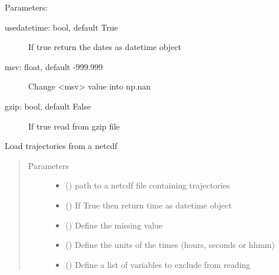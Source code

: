 \documentclass[a4paper,10pt,english]{sphinxmanual}
\begin{document}
\begin{fulllineitems}
\begin{fulllineitems}
Parameters:
\begin{description}
\item[{usedatetime: bool, default True}] \leavevmode
If true return the dates as datetime object

\item[{msv: float, default -999.999}] \leavevmode
Change \textless{}msv\textgreater{} value into np.nan

\item[{gzip: bool, default False}] \leavevmode
If true read from gzip file

\end{description}

\end{fulllineitems}


\begin{fulllineitems}
\label{\detokenize{lagranto:lagranto.Tra.load_netcdf}}
Load trajectories from a netcdf
\begin{quote}\begin{description}
\item[{Parameters}] \leavevmode\begin{itemize}
\item {} 
 (\sphinxstyleliteralemphasis{,}) \textendash{} path to a netcdf file containing trajectories

\item {} 
 (\sphinxstyleliteralemphasis{, }) \textendash{} If True then return time as datetime object

\item {} 
 (\sphinxstyleliteralemphasis{, }) \textendash{} Define the missing value

\item {} 
 (\sphinxstyleliteralemphasis{, }) \textendash{} Define the units of the times (hours, seconds or hhmm)

\item {} 
 (\sphinxstyleliteralemphasis{, }) \textendash{} Define a list of variables to exclude from reading


\end{itemize}
\end{description}
\end{quote}
\end{fulllineitems}
\end{fulllineitems}
\end{document}

